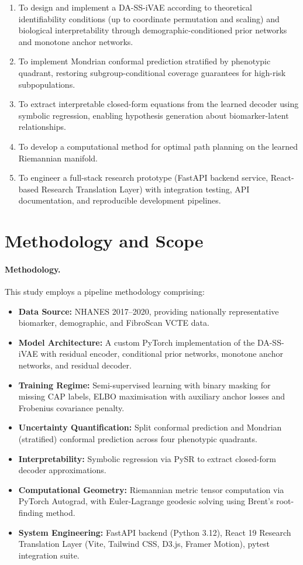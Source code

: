 \documentclass[12pt,a4paper,oneside]{report}
\newcommand{\daivae}{DA-SS-iVAE}
\begin{document}
\begin{enumerate}[leftmargin=*]
    \item To design and implement a \daivae{} according to theoretical identifiability conditions (up to coordinate permutation and scaling) and biological interpretability through demographic-conditioned prior networks and monotone anchor networks.
    \item To implement Mondrian conformal prediction stratified by phenotypic quadrant, restoring subgroup-conditional coverage guarantees for high-risk subpopulations.
    \item To extract interpretable closed-form equations from the learned decoder using symbolic regression, enabling hypothesis generation about biomarker-latent relationships.
    \item To develop a computational method for optimal path planning on the learned Riemannian manifold.
    \item To engineer a full-stack research prototype (FastAPI backend service, React-based Research Translation Layer) with integration testing, API documentation, and reproducible development pipelines.
\end{enumerate}

\section{Methodology and Scope}

\paragraph{Methodology.} This study employs a pipeline methodology comprising:
\begin{itemize}[leftmargin=*]
    \item \textbf{Data Source:} NHANES 2017--2020, providing nationally representative biomarker, demographic, and FibroScan VCTE data.
    \item \textbf{Model Architecture:} A custom PyTorch implementation of the \daivae{} with residual encoder, conditional prior networks, monotone anchor networks, and residual decoder.
    \item \textbf{Training Regime:} Semi-supervised learning with binary masking for missing CAP labels, ELBO maximisation with auxiliary anchor losses and Frobenius covariance penalty.
    \item \textbf{Uncertainty Quantification:} Split conformal prediction and Mondrian (stratified) conformal prediction across four phenotypic quadrants.
    \item \textbf{Interpretability:} Symbolic regression via PySR to extract closed-form decoder approximations.
    \item \textbf{Computational Geometry:} Riemannian metric tensor computation via PyTorch Autograd, with Euler-Lagrange geodesic solving using Brent's root-finding method.
    \item \textbf{System Engineering:} FastAPI backend (Python 3.12), React 19 Research Translation Layer (Vite, Tailwind CSS, D3.js, Framer Motion), pytest integration suite.
\end{itemize}
\end{document}
